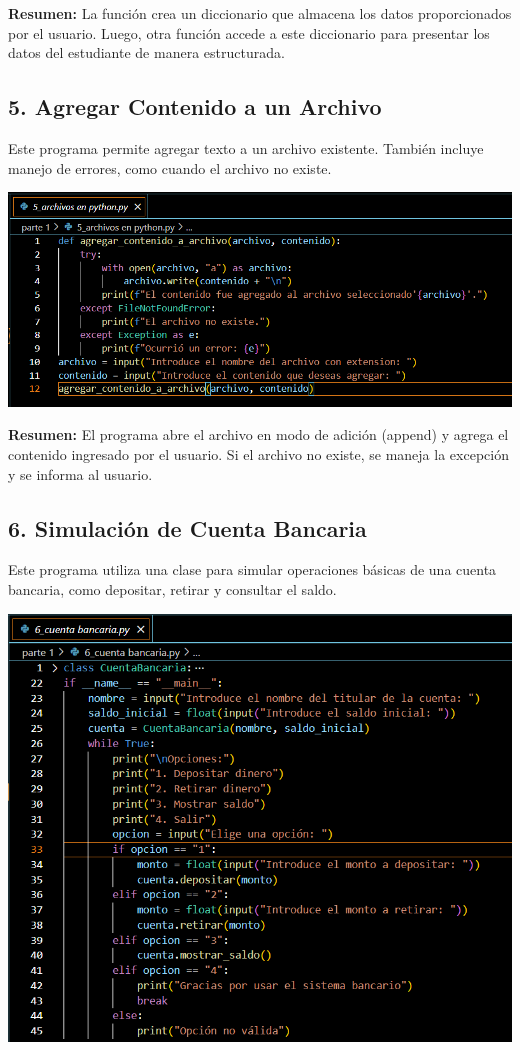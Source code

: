 \documentclass{article}
\begin{document}
\noindent \textbf{Resumen:} La función crea un diccionario que almacena los datos proporcionados por el usuario. Luego, otra función accede a este diccionario para presentar los datos del estudiante de manera estructurada.

\subsection*{5. Agregar Contenido a un Archivo}
Este programa permite agregar texto a un archivo existente. También incluye manejo de errores, como cuando el archivo no existe.

\begin{center}
\includegraphics[width=\textwidth]{codigo5.jpg} %
\end{center}

\noindent \textbf{Resumen:} El programa abre el archivo en modo de adición (append) y agrega el contenido ingresado por el usuario. Si el archivo no existe, se maneja la excepción y se informa al usuario.

\subsection*{6. Simulación de Cuenta Bancaria}
Este programa utiliza una clase para simular operaciones básicas de una cuenta bancaria, como depositar, retirar y consultar el saldo.

\begin{center}
\includegraphics[width=\textwidth]{codigo6.jpg} %
\end{center}
\end{document}
